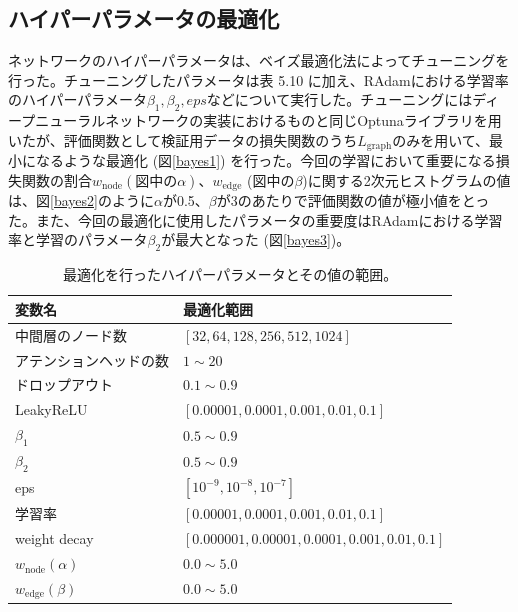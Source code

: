 \subsection{ハイパーパラメータの最適化}
ネットワークのハイパーパラメータは、ベイズ最適化法によってチューニングを行った。チューニングしたパラメータは表 5.10%
に加え、RAdamにおける学習率のハイパーパラメータ$\beta_1, \beta_2, eps$などについて実行した。チューニングにはディープニューラルネットワークの実装におけるものと同じOptunaライブラリを用いたが、評価関数として検証用データの損失関数のうち$ L_\mathrm{{graph}}$のみを用いて、最小になるような最適化 (図\ref{bayes1}) を行った。今回の学習において重要になる損失関数の割合$w_{\mathrm{node}} (図中の\alpha)$、$w_{\mathrm{edge}}$ (図中の$\beta$)に関する2次元ヒストグラムの値は、図\ref{bayes2}のように$\alpha$が0.5、$\beta$が3のあたりで評価関数の値が極小値をとった。また、今回の最適化に使用したパラメータの重要度はRAdamにおける学習率と学習のパラメータ$\beta_2$が最大となった (図\ref{bayes3})。
\begin{table}[H]
\centering
 \begin{tabular}{ l  l }
 \hline
 変数名 & 最適化範囲\\
 \hline
 \hline
 中間層のノード数 & $[32, 64, 128, 256, 512, 1024]$\\
 アテンションヘッドの数 & $1 \sim 20$\\
 ドロップアウト & $0.1 \sim 0.9$\\
 LeakyReLU & $[0.00001, 0.0001, 0.001, 0.01, 0.1]$\\
 $\beta_1$ & $0.5 \sim 0.9$\\ 
 $\beta_2$ & $0.5 \sim 0.9$\\ 
 eps & $[10^{-9}, 10^{-8}, 10^{-7}]$\\
 学習率 & $[0.00001, 0.0001, 0.001, 0.01, 0.1]$\\
 weight decay & $[0.000001, 0.00001, 0.0001, 0.001, 0.01, 0.1]$\\
 $w_{\mathrm{node}}(\alpha)$ & $0.0 \sim 5.0$\\
 $w_{\mathrm{edge}}(\beta)$ & $0.0 \sim 5.0$\\
  \hline
 \end{tabular}
 \label{gnnoptuna}
 \caption{最適化を行ったハイパーパラメータとその値の範囲。}
\end{table}

